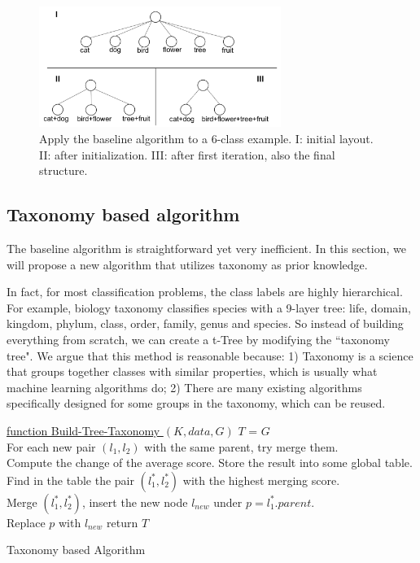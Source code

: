 \documentclass{article}
\begin{document}
\begin{figure}[ht]\label{fig:example_baseline}
  \centering
  \includegraphics[width=0.7\textwidth]{6_class.png}
  \caption{Apply the baseline algorithm to a 6-class example. I: initial layout. II: after initialization. III: after first iteration, also the final structure.}
\end{figure}

\subsection{Taxonomy based algorithm}\label{ss:texonomy}
The baseline algorithm is straightforward yet very inefficient. In this section, we will propose a new algorithm that utilizes taxonomy as prior knowledge. 

In fact, for most classification problems, the class labels are highly hierarchical. For example, biology taxonomy classifies species with a 9-layer tree: life, domain, kingdom, phylum, class, order, family, genus and species. So instead of building everything from scratch, we can create a t-Tree by modifying the ``taxonomy tree". We argue that this method is reasonable because: 1) Taxonomy is a science that groups together classes with similar properties, which is usually what machine learning algorithms do; 2) There are many existing algorithms specifically designed for some groups in the taxonomy, which can be reused.

\begin{algorithm}[H]\label{ag:taxonomy}

    \underline{function Build-Tree-Taxonomy $(K, data, G)$}\;
    $T$ = $G$ \\
      {
        For each new pair $(l_1,l_2)$ with the same parent, try merge them. \\
        Compute the change of the average score. Store the result into some global table.\\
        Find in the table the pair $(l_1^*,l_2^*)$ with the highest merging score.\\
        Merge $(l_1^*,l_2^*)$, insert the new node $l_{new}$ under $p = l_1^*.parent$.\\
        {
            Replace $p$ with $l_{new}$
        }
      }
    return $T$
    \caption{Taxonomy based Algorithm}
\end{algorithm}
\end{document}
